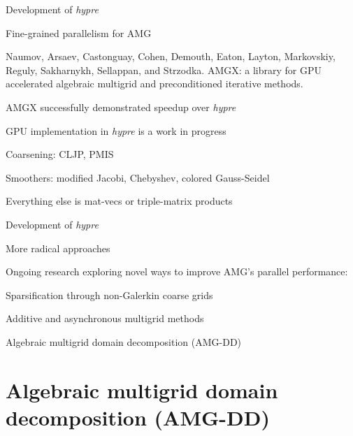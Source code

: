 \documentclass[18pt,xcolor=table]{beamer}
\begin{document}
\begin{frame}{Development of \emph{hypre}}
\begin{block}{Fine-grained parallelism for AMG}
\bit
\item Naumov, Arsaev, Castonguay, Cohen, Demouth, Eaton, Layton, Markovskiy, Reguly, Sakharnykh, Sellappan, and Strzodka. AMGX: a library for GPU accelerated algebraic multigrid and preconditioned iterative methods.
\item AMGX successfully demonstrated speedup over \emph{hypre}
\item GPU implementation in \emph{hypre} is a work in progress
\item Coarsening: CLJP, PMIS
\item Smoothers: modified Jacobi, Chebyshev, colored Gauss-Seidel
\item Everything else is mat-vecs or triple-matrix products
\eit
\end{block}
\end{frame}

\begin{frame}{Development of \emph{hypre}}
\begin{block}{More radical approaches}
\bit
\item Ongoing research exploring novel ways to improve AMG's parallel performance:
\bit
\item Sparsification through non-Galerkin coarse grids
\item Additive and asynchronous multigrid methods
\item Algebraic multigrid domain decomposition (AMG-DD)
\eit
\eit
\end{block}
\end{frame}



\section{Algebraic multigrid domain decomposition (AMG-DD)}
\end{document}
